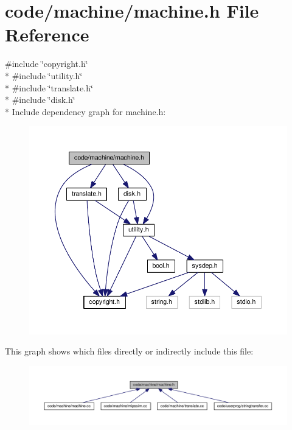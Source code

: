 \section{code/machine/machine.h File Reference}
\label{machine_8h}
{\ttfamily \#include \char`\"{}copyright.\+h\char`\"{}}\\*
{\ttfamily \#include \char`\"{}utility.\+h\char`\"{}}\\*
{\ttfamily \#include \char`\"{}translate.\+h\char`\"{}}\\*
{\ttfamily \#include \char`\"{}disk.\+h\char`\"{}}\\*
Include dependency graph for machine.\+h\+:
\nopagebreak
\begin{figure}[H]
\begin{center}
\leavevmode
\includegraphics[width=350pt]{machine_8h__incl}
\end{center}
\end{figure}
This graph shows which files directly or indirectly include this file\+:
\nopagebreak
\begin{figure}[H]
\begin{center}
\leavevmode
\includegraphics[width=350pt]{machine_8h__dep__incl}
\end{center}
\end{figure}
